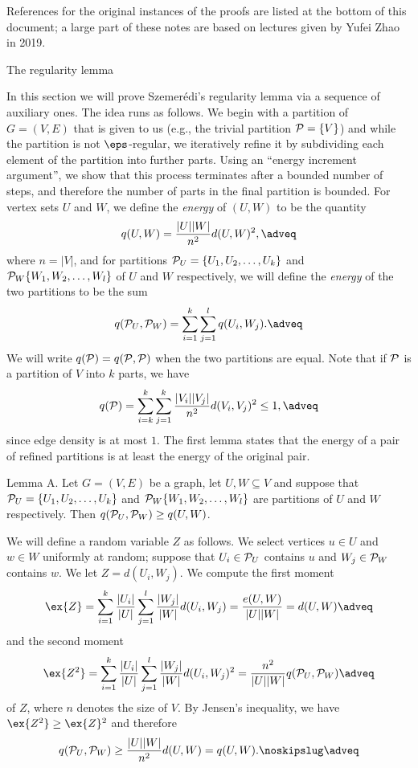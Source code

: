 References for the original instances of the proofs are listed at the bottom of this document; a large part of
these notes are based on lectures given by Yufei Zhao in 2019.

\advsect The regularity lemma

In this section we will prove Szemer\'edi's regularity lemma via a sequence of auxiliary ones. The idea runs
as follows. We begin with a partition of $G=(V,E)$ that is given to us
(e.g., the trivial partition $\P = \{V\}$) and while the partition
is not $\eps$-regular, we iteratively refine
it by subdividing each element of the partition into further parts.
Using an ``energy increment argument'', we show that this
process terminates after a bounded number of steps, and therefore the number of parts in the final partition
is bounded. For vertex sets $U$ and $W$, we define the {\it energy} of $(U,W)$
to be the quantity
$$q(U,W) = {|U||W|\over n^2}d(U,W)^2,\adveq$$
where $n=|V|$, and for partitions $\P_U = \{U_1,U_2, \ldots,U_k\}$ and $\P_W\{W_1,W_2,\ldots, W_l\}$
of $U$ and $W$ respectively, we will define the {\it energy} of the two partitions to be the sum
$$q(\P_U, \P_W) = \sum_{i=1}^k\sum_{j=1}^l q(U_i, W_j).\adveq$$
We will write $q(\P) = q(\P,\P)$ when the two partitions are equal. Note that if $\P$ is a partition of
$V$ into $k$ parts, we have
$$q(\P) = \sum_{i=k}^k\sum_{j=1}^k {|V_i||V_j|\over n^2} d(V_i,V_j)^2 \leq 1,\adveq$$
since edge density is at most $1$.
The first lemma states that the energy of a pair of refined partitions is at least the energy of the original
pair.

\proclaim Lemma A. Let $G=(V,E)$ be a graph, let $U,W\subseteq V$ and suppose that
$\P_U = \{U_1,U_2, \ldots,U_k\}$ and $\P_W\{W_1,W_2,\ldots, W_l\}$ are partitions of $U$ and $W$ respectively.
Then $q(\P_U,\P_W)\geq q(U,W)$.

\proof We will define a random variable $Z$ as follows. We select vertices $u\in U$ and $w\in W$ uniformly
at random; suppose that $U_i\in \P_U$ contains $u$ and $W_j\in \P_W$ contains $w$. We let $Z = d(U_i,W_j)$.
We compute the first moment
$$\ex\{Z\} = \sum_{i=1}^k{|U_i|\over |U|}\sum_{j=1}^l {|W_j|\over|W|} d(U_i,W_j) = {e(U,W)\over |U||W|} = d(U,W)
\adveq$$
and the second moment
$$\ex\{Z^2\}=\sum_{i=1}^k{|U_i|\over |U|}\sum_{j=1}^l {|W_j|\over|W|} d(U_i,W_j)^2={n^2\over |U||W|}q(\P_U,\P_W)
\adveq$$
of $Z$, where $n$ denotes the size of $V$. By Jensen's inequality, we have $\ex\{Z^2\}\geq\ex\{Z\}^2$ and therefore
$$q(\P_U,\P_W)\geq {|U||W|\over n^2}d(U,W) = q(U,W).\noskipslug\adveq$$

